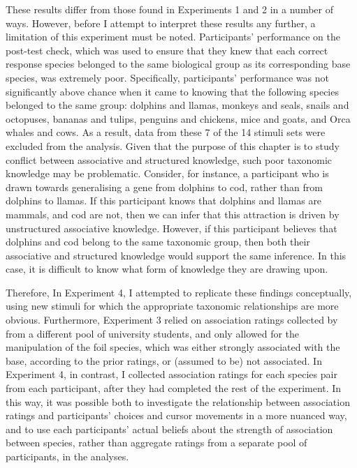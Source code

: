 These results differ from those found in Experiments 1 and 2 in a number of ways.
However, before I attempt to interpret these results any further,
a limitation of this experiment must be noted.
Participants' performance on the post-test check,
which was used to ensure that they knew that
each correct response species belonged to the same biological group
as its corresponding base species, was extremely poor.
Specifically, participants' performance was not significantly above chance
when it came to knowing that the following species belonged to the same group:
dolphins and llamas,
monkeys and seals,
snails  and octopuses,
bananas and tulips,
penguins and chickens,
mice and goats,
and Orca whales and cows.
As a result, data from these 7 of the 14 stimuli sets
were excluded from the analysis.
Given that the purpose of this chapter is to study
conflict between associative and structured knowledge,
such poor taxonomic knowledge may be problematic.
Consider, for instance, 
a participant who is drawn towards 
generalising a gene from dolphins to cod,
rather than from dolphins to llamas.
If this participant knows that dolphins and llamas are mammals,
and cod are not, then we can infer that this attraction
is driven by unstructured associative knowledge.
However, if this participant believes that
dolphins and cod belong to the same taxonomic group,
then both their associative and structured knowledge
would support the same inference.
In this case, it is difficult to know what form of knowledge
they are drawing upon.

Therefore, In Experiment 4, I attempted to replicate these findings conceptually,
using new stimuli for which the appropriate taxonomic relationships are more obvious.
Furthermore, Experiment 3 relied on association ratings
collected by \citet[][Chapter 2]{Crisp-Bright2010}
from a different pool of university students,
and only allowed for the manipulation of the foil species,
which was either strongly associated with the base,
according to the prior ratings,
or (assumed to be) not associated.
In Experiment 4, in contrast,
I collected association ratings for each species pair
from each participant, after they had completed the rest of the experiment.
In this way, it was possible both to
investigate the relationship between association ratings
and participants' choices and cursor movements in a more nuanced way,
and to use each participants' actual beliefs about
the strength of association between species,
rather than aggregate ratings from a separate pool of participants,
in the analyses.
